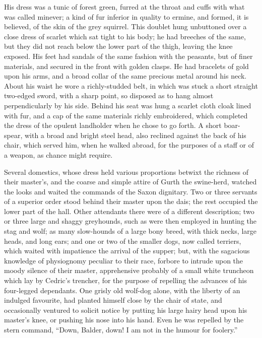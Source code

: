 His dress was a tunic of forest green, furred at the throat and cuffs
with what was called minever; a kind of fur inferior in quality to
ermine, and formed, it is believed, of the skin of the grey squirrel.
This doublet hung unbuttoned over a close dress of scarlet which sat
tight to his body; he had breeches of the same, but they did not reach
below the lower part of the thigh, leaving the knee exposed. His feet
had sandals of the same fashion with the peasants, but of finer
materials, and secured in the front with golden clasps. He had bracelets
of gold upon his arms, and a broad collar of the same precious metal
around his neck. About his waist he wore a richly-studded belt, in which
was stuck a short straight two-edged sword, with a sharp point, so
disposed as to hang almost perpendicularly by his side. Behind his seat
was hung a scarlet cloth cloak lined with fur, and a cap of the same
materials richly embroidered, which completed the dress of the opulent
landholder when he chose to go forth. A short boar-spear, with a broad
and bright steel head, also reclined against the back of his chair,
which served him, when he walked abroad, for the purposes of a staff or
of a weapon, as chance might require.

Several domestics, whose dress held various proportions betwixt the
richness of their master's, and the coarse and simple attire of Gurth
the swine-herd, watched the looks and waited the commands of the Saxon
dignitary. Two or three servants of a superior order stood behind their
master upon the dais; the rest occupied the lower part of the hall.
Other attendants there were of a different description; two or three
large and shaggy greyhounds, such as were then employed in hunting the
stag and wolf; as many slow-hounds of a large bony breed, with thick
necks, large heads, and long ears; and one or two of the smaller dogs,
now called terriers, which waited with impatience the arrival of the
supper; but, with the sagacious knowledge of physiognomy peculiar to
their race, forbore to intrude upon the moody silence of their master,
apprehensive probably of a small white truncheon which lay by Cedric's
trencher, for the purpose of repelling the advances of his four-legged
dependants. One grisly old wolf-dog alone, with the liberty of an
indulged favourite, had planted himself close by the chair of state, and
occasionally ventured to solicit notice by putting his large hairy head
upon his master's knee, or pushing his nose into his hand. Even he was
repelled by the stern command, ``Down, Balder, down! I am not in the
humour for foolery.''

